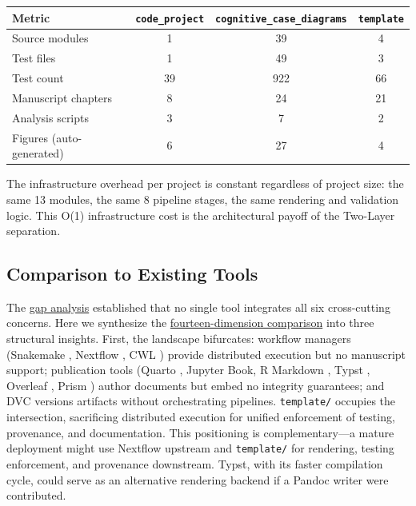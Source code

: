 \documentclass[
]{article}
\newcounter{none} %
\begin{document}
{\def\LTcaptype{none} %
\begin{longtable}[]{@{}lccc@{}}
\toprule\noalign{}
Metric & \texttt{code\_project} & \texttt{cognitive\_case\_diagrams} &
\texttt{template} \\
\midrule\noalign{}
\endhead
\bottomrule\noalign{}
\endlastfoot
Source modules & 1 & 39 & 4 \\
Test files & 1 & 49 & 3 \\
Test count & 39 & 922 & 66 \\
Manuscript chapters & 8 & 24 & 21 \\
Analysis scripts & 3 & 7 & 2 \\
Figures (auto-generated) & 6 & 27 & 4 \\
\end{longtable}
}

The infrastructure overhead per project is constant regardless of
project size: the same 13 modules, the same 8 pipeline stages, the same
rendering and validation logic. This O(1) infrastructure cost is the
architectural payoff of the Two-Layer separation.

\newpage

\subsection{Comparison to Existing
Tools}\label{comparison-to-existing-tools}

The \href{02_introduction.md\#the-gap}{gap analysis} established that no
single tool integrates all six cross-cutting concerns. Here we
synthesize the
\href{08f_appendix_matrix.md\#appendix-matrix}{fourteen-dimension
comparison} into three structural insights. First, the landscape
bifurcates: workflow managers (Snakemake \citep{koster2012snakemake},
Nextflow \citep{ditommaso2017nextflow}, CWL \citep{amstutz2016cwl})
provide distributed execution but no manuscript support; publication
tools (Quarto \citep{allaire2024quarto}, Jupyter Book, R Markdown
\citep{xie2018dynamic}, Typst \citep{madje2023typst}, Overleaf
\citep{overleaf2025}, Prism \citep{openai2026prism}) author documents
but embed no integrity guarantees; and DVC \citep{iterative2024dvc}
versions artifacts without orchestrating pipelines. \texttt{template/}
occupies the intersection, sacrificing distributed execution for unified
enforcement of testing, provenance, and documentation. This positioning
is complementary---a mature deployment might use Nextflow upstream and
\texttt{template/} for rendering, testing enforcement, and provenance
downstream. Typst, with its faster compilation cycle, could serve as an
alternative rendering backend if a Pandoc writer were contributed.
\end{document}
